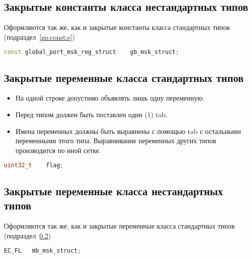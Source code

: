 \subsection{Закрытые константы класса нестандартных типов}\label{zp:const:n}
Оформляются так же, как и закрытые константы класса стандартных типов (подраздел~\ref{zp:const:s})\begin{lstlisting}[language=C++, frame=tlBR, basicstyle=\fontsize{10}{10}\ttfamily]
	const global_port_msk_reg_struct	gb_msk_struct;
\end{lstlisting}

\subsection{Закрытые переменные класса стандартных типов}\label{zp:pp:s}
\begin{itemize}
	\item На одной строке допустимо объявлять лишь одну переменную.
	\item Перед типом должен быть поставлен один (1) tab.
	\item Имена переменных должны быть выравнены с помощью tab с остальными переменными этого типа. Выравнивание переменных других типов производится по иной сетке.
\end{itemize}\begin{lstlisting}[language=C++, frame=tlBR, basicstyle=\fontsize{10}{10}\ttfamily]
	uint32_t	flag;
\end{lstlisting}

\subsection{Закрытые переменные класса нестандартных типов}\label{zp:pp:n}
Оформляются так же, как и закрытые переменные класса стандартных типов (подраздел~\ref{zp:pp:s})\begin{lstlisting}[language=C++, frame=tlBR, basicstyle=\fontsize{10}{10}\ttfamily]
	EC_FL	mb_msk_struct;
\end{lstlisting}